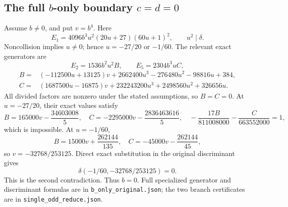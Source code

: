 \documentclass[11pt,a4paper]{article}
\theoremstyle{remark}
\begin{document}
\subsection{The full \texorpdfstring{\(b\)}{b}-only boundary \texorpdfstring{\(c=d=0\)}{c=d=0}}
Assume \(b\ne0\), and put \(v=b^4\). Here
\[
 E_1=4096b^3u^2(20u+27)(60u+1)^2,\qquad u^2\mid\delta.
\]
Noncollision implies \(u\ne0\); hence \(u=-27/20\) or \(-1/60\).
The relevant exact generators are
\[
 E_2=1536b^2u^2B,\qquad E_5=2304b^3uC,
\]
\begin{align*}
 B={}&(-112500u+13125)v+
       2662400u^3-276480u^2-98816u+384,\\
 C={}&(1687500u-16875)v+
       232243200u^3+2498560u^2+326656u.
\end{align*}
All divided factors are nonzero under the stated assumptions, so
\(B=C=0\). At \(u=-27/20\), their exact values satisfy
\[
 B=165000v-\frac{34603008}{5},\quad
 C=-2295000v-\frac{2836463616}{5},\quad
 -\frac{17B}{811008000}-\frac{C}{663552000}=1,
\]
which is impossible. At \(u=-1/60\),
\[
 B=15000v+\frac{262144}{135},\quad
 C=-45000v-\frac{262144}{45},
\]
so \(v=-32768/253125\). Direct exact substitution in the original
discriminant gives
\[
 \delta(-1/60,-32768/253125)=0.
\]
This is the second contradiction.
Thus \(b=0\). Full specialized generator and discriminant formulas are
in \texttt{b\_only\_original.json}; the two branch certificates are in
\texttt{single\_odd\_reduce.json}.
\end{document}
